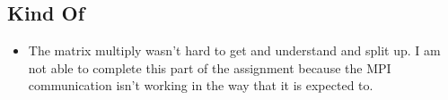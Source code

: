 \documentclass[12pt, letterpaper]{article}
\begin{document}
\subsection{Kind Of}
\begin{itemize}
  \item The matrix multiply wasn't hard to get and understand and split up. I am not able to complete this part of the assignment because the MPI communication isn't working in the way that it is expected to.
\end{itemize}
%
\end{document}
